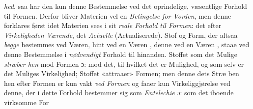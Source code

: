 \emph{hed}, saa har den kun denne Bestemmelse ved det oprindelige,
væsentlige Forhold til Formen. Derfor bliver Materien vel en
\emph{Betingelse for Vorden}, men denne forklares først idet
Materien sees i sit \emph{reale Forhold til Formen}: det efter
\emph{Virkeligheden Værende}, det \emph{Actuelle} (Actualiserede).
Stof og Form, der altsaa \emph{begge} bestemmes ved Væren, hint
ved en Væren , denne ved en Væren , staae
ved denne Bestemmelse i \emph{nødvendigt} Forhold til hinanden.
Stoffet som det Mulige \emph{stræber hen} mod Formen ɔ: mod
det, til hvilket det er Mulighed, og som selv er det Muliges
Virkelighed; Stoffet «attraaer» Formen; men denne dets Stræ\-%
ben hen efter Formen er kun vakt \emph{ved Formen} og faaer
kun Virkeliggjørelse ved denne, der i dette Forhold bestemmer
sig som \emph{Entelechie} ɔ: som det iboende virksomme For\-%

